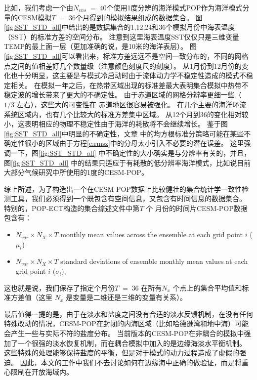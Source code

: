 比如，我们考虑一个由$N_{ens} \;=\; 40$个使用1度分辨的海洋模式POP作为海洋模式分量的CESM模拟$T\;=\;36$个月得到的模拟结果组成的数据集合。 
图 \ref{fig:SST_STD_all}中给出的是数据集合的1,12,24和36个模拟月份中海表温度（SST）的标准方差的空间分布。
注意到这里海表温度SST仅仅只是三维变量TEMP的最上面一层（更加准确的说，是10米的海洋表层）。
图 \ref{fig:SST_STD_all}可以看出来，标准方差远远不是空间一致分布的，不同的网格点之间的值相差好几个数量级（注意颜色刻度尺的刻度）。 
从1月份到12月份的变化也十分明显，这主要是与模式冷启动时由于流体动力学不稳定性造成的模式不稳定相关。  
在模拟一年之后，在热带区域出现的标准差最大表明集合模拟中热带不稳定波的增长带来了更大的不确定性\citep{legeckis1977}。
由于赤道区域的网格分辨率更细一些（$1/3^\circ$左右），这些大的可变性在 赤道地区很容易被强化。 
在几个主要的海洋环流系统区域内，也有几个比较大的标准方差集中区域。
从12个月到36的变化相对较小，这表明相应的物理不稳定性由于海洋的耗散将不会继续增长。
鉴于图 \ref{fig:SST_STD_all}中明显的不确定性，文章\cite{yong2015} 中的均方根标准分策略可能在某些不确定性很小的区域由于方程\ref{e:rmsz}中的分母太小引入不必要的潜在误差。
这里强调一下，图\ref{fig:SST_STD_all} 中不确定性的大小确实是与分辨率有关的，并且，图\ref{fig:SST_STD_all} 中的结果只适应于有耗散的低分辨率海洋模式，比如说目前大部分气候研究中所使用的1度的CESM-POP。


 
综上所述，为了构造出一个在CESM-POP数据上比较健壮的集合统计学一致性检测工具，我们必须得到一个既包含有空间信息，又包含有时间信息的数据集合。
特别的，POP-ECT构造的集合综述文件中第$T$ 个 月份的时间片CESM-POP数据包含有：
\begin{itemize}
 \item $N_{var} \times N_X \times T$  monthly mean values across the ensemble at each grid point $i$ ($\mu_i$)
 \item $N_{var} \times N_X \times T$ standard deviations of ensemble monthly mean values at each grid point $i$ ($\sigma_i$),
 \end{itemize}
 这也就是说，我们保存了指定个月份$T \;=\; 36$ 在所有$N_x$ 个点上的集合平均值和标准方差值（这里 $N_x$ 是变量是二维还是三维的变量有关系）。
 

 最后值得一提的是，由于在淡水和盐度之间没有合适的淡水反馈机制，在没有任何特殊改动的情况，CESM-POP在封闭的内海区域（比如哈德逊湾和地中海）可能会产生一些与实际不符的盐度分布。
当前版本的CESM-POP在非耦合的模拟中强加了一个很强的淡水恢复机制，而在耦合模拟中加入的是边缘海淡水平衡机制。
这些特殊的处理能够保持盐度的平衡，但是对于模式的动力过程造成了虚假的强迫。
因此，本文的工作中我们不去讨论如何在边缘海中正确的做验证，而是将重心限制在开放海域内。

